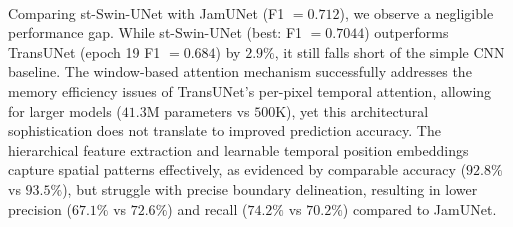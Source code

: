 \documentclass[10pt,oneside,a4paper,english]{article}
\begin{document}
\\
Comparing st-Swin-UNet with JamUNet (F1 $= 0.712$), we observe a negligible performance gap. While st-Swin-UNet (best: F1 $= 0.7044$) outperforms TransUNet (epoch 19 F1 $= 0.684$) by $2.9\%$, it still falls short of the simple CNN baseline. The window-based attention mechanism successfully addresses the memory efficiency issues of TransUNet's per-pixel temporal attention, allowing for larger models ($41.3$M parameters vs $500$K), yet this architectural sophistication does not translate to improved prediction accuracy. The hierarchical feature extraction and learnable temporal position embeddings capture spatial patterns effectively, as evidenced by comparable accuracy ($92.8\%$ vs $93.5\%$), but struggle with precise boundary delineation, resulting in lower precision ($67.1\%$ vs $72.6\%$) and recall ($74.2\%$ vs $70.2\%$) compared to JamUNet.
\end{document}
